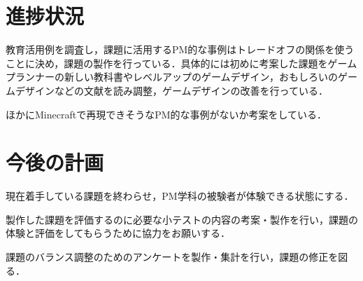 \documentclass[uplatex,twocolumn,dvipdfmx]{jsarticle}
\begin{document}
\section{進捗状況}
教育活用例を調査し，課題に活用するPM的な事例はトレードオフの関係を使うことに決め，課題の製作を行っている．具体的には初めに考案した課題をゲームプランナーの新しい教科書やレベルアップのゲームデザイン，おもしろいのゲームデザインなどの文献を読み調整，ゲームデザインの改善を行っている．


ほかにMinecraftで再現できそうなPM的な事例がないか考案をしている．



\section{今後の計画}
現在着手している課題を終わらせ，PM学科の被験者が体験できる状態にする．


製作した課題を評価するのに必要な小テストの内容の考案・製作を行い，課題の体験と評価をしてもらうために協力をお願いする．


課題のバランス調整のためのアンケートを製作・集計を行い，課題の修正を図る．




\end{document}
